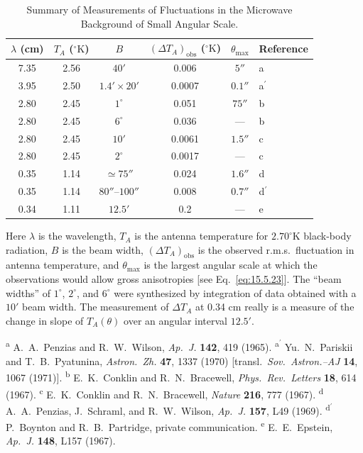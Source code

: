 \begingroup
\renewcommand{\thetable}{15.2}
\begin{table}[htbp]
  \centering
  \caption{Summary of Measurements of Fluctuations in the Microwave
  Background of Small Angular Scale.}
  \label{tab:15.2}
  \scriptsize
  \setlength{\tabcolsep}{4pt}
  \begin{tabular}{@{}cccccl@{}}
    \toprule
    \(\lambda\) (cm) & \(T_A\) (\(^{\circ}\mathrm K\)) & \(B\) &
    \((\Delta T_A)_{\mathrm{obs}}\) (\(^{\circ}\mathrm K\)) &
    \(\theta_{\max}\) & Reference\\
    \midrule
    7.35 & 2.56 & \(40'\) & 0.006 & \(5''\) & a\\
    3.95 & 2.50 & \(1.4'\times20'\) & 0.0007 & \(0.1''\) & a\(^{\prime}\)\\
    2.80 & 2.45 & \(1^\circ\) & 0.051 & \(75''\) & b\\
    2.80 & 2.45 & \(6^\circ\) & 0.036 & --- & b\\
    2.80 & 2.45 & \(10'\) & 0.0061 & \(1.5''\) & c\\
    2.80 & 2.45 & \(2^\circ\) & 0.0017 & --- & c\\
    0.35 & 1.14 & \(\simeq75''\) & 0.024 & \(1.6''\) & d\\
    0.35 & 1.14 & \(80''\)--\(100''\) & 0.008 & \(0.7''\) & d\(^{\prime}\)\\
    0.34 & 1.11 & \(12.5'\) & 0.2 & --- & e\\
    \bottomrule
  \end{tabular}

  \vspace{0.5em}
  \begin{minipage}{0.95\textwidth}
    Here \(\lambda\) is the wavelength, \(T_A\) is the antenna temperature
    for \(2.70^\circ\mathrm K\) black-body radiation, \(B\) is the beam width,
    \((\Delta T_A)_{\mathrm{obs}}\) is the observed r.m.s.\ fluctuation in antenna
    temperature, and \(\theta_{\max}\) is the largest angular scale at which
    the observations would allow gross anisotropies [see
    Eq.~\eqref{eq:15.5.23}]. The ``beam widths'' of \(1^\circ\), \(2^\circ\),
    and \(6^\circ\) were synthesized by integration of data obtained with a
    \(10'\) beam width. The measurement of \(\Delta T_A\) at 0.34 cm really is
    a measure of the change in slope of \(T_A(\theta)\) over an angular
    interval \(12.5'\).

    \textsuperscript{a} A.~A.~Penzias and R.~W.~Wilson, \emph{Ap.\ J.}
    \textbf{142}, 419 (1965).
    \textsuperscript{a\(^{\prime}\)} Yu.~N.~Pariskii and T.~B.~Pyatunina,
    \emph{Astron.\ Zh.} \textbf{47}, 1337 (1970) [transl.\ \emph{Sov.\
    Astron.--AJ} \textbf{14}, 1067 (1971)].
    \textsuperscript{b} E.~K.~Conklin and R.~N.~Bracewell, \emph{Phys.\ Rev.\
    Letters} \textbf{18}, 614 (1967).
    \textsuperscript{c} E.~K.~Conklin and R.~N.~Bracewell, \emph{Nature}
    \textbf{216}, 777 (1967).
    \textsuperscript{d} A.~A.~Penzias, J.~Schraml, and R.~W.~Wilson,
    \emph{Ap.\ J.} \textbf{157}, L49 (1969).
    \textsuperscript{d\(^{\prime}\)} P.~Boynton and R.~B.~Partridge, private
    communication.
    \textsuperscript{e} E.~E.~Epstein, \emph{Ap.\ J.} \textbf{148}, L157
    (1967).
  \end{minipage}
\end{table}
